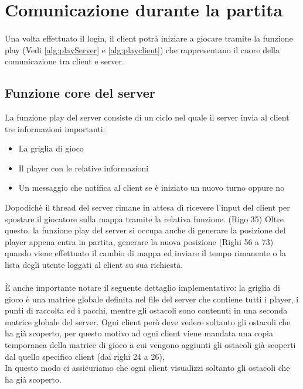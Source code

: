 \documentclass[a4paper]{article}
\begin{document}
\section{Comunicazione durante la partita}
\paragraph{}
Una volta effettuato il login, il client potrà iniziare a giocare tramite la funzione play (Vedi \autoref{alg:playServer} e \autoref{alg:playclient})
che rappresentano il cuore della comunicazione tra client e server.
\subsection{Funzione core del server}
La funzione play del server consiste di un ciclo nel quale il server invia al client tre informazioni importanti:
\begin{itemize}
  \setlength\itemsep{0.2mm}
  \item La griglia di gioco 
  \item Il player con le relative informazioni 
  \item Un messaggio che notifica al client se è iniziato un nuovo turno oppure no 
\end{itemize}
Dopodichè il thread del server rimane in attesa di ricevere l'input del client per spostare il giocatore sulla mappa tramite la relativa funzione. (Rigo 35)
Oltre questo, la funzione play del server si occupa anche di generare la posizione del player appena entra in partita,
 generare la nuova posizione  (Righi 56 a 73) quando viene effettuato il cambio di mappa ed inviare il tempo rimanente 
 o la lista degli utente loggati al client su sua richiesta. 

\paragraph{}
È anche importante notare il seguente dettaglio implementativo: la griglia di gioco
è una matrice globale definita nel file del server che contiene tutti i player,
i punti di raccolta ed i pacchi,  mentre gli ostacoli sono contenuti in una seconda matrice globale del server. 
Ogni client però deve vedere soltanto gli ostacoli che ha già scoperto, 
per questo motivo ad ogni client viene mandata una copia temporanea della matrice di gioco
a cui vengono aggiunti gli ostacoli già scoperti dal quello specifico client (dai righi 24 a 26), 
\\In questo modo ci assicuriamo che ogni client visualizzi soltanto gli ostacoli che ha già scoperto.
\end{document}
